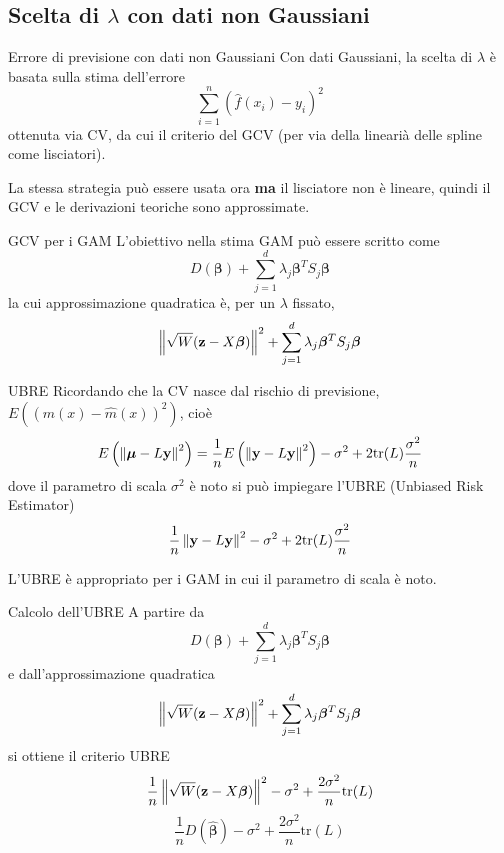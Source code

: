 \documentclass{beamer}\usepackage[]{graphicx}\usepackage[]{color}
\newcommand{\spazio}{\noindent\makebox[\linewidth]{\resizebox{0.1\linewidth}{1pt}{{$\bullet$}}}}
\begin{document}
\subsection{Scelta di $\lambda$ con dati non Gaussiani}

\begin{frame}{Errore di previsione  con dati non Gaussiani}
Con dati Gaussiani, la scelta di $\lambda$ \`e basata sulla stima dell'errore
\[ \sum_{i=1}^n (\hat{f}(x_i)-y_i)^2 \]
ottenuta via CV, da cui il criterio del GCV (per via della lineari\`a delle spline come lisciatori).

\spazio

La stessa strategia pu\`o essere usata ora {\bf ma} il lisciatore non \`e lineare, quindi il GCV e le derivazioni teoriche sono approssimate.

\end{frame}


\begin{frame}[t]{GCV per i GAM}
L'obiettivo nella stima GAM pu\`o essere scritto
come
\[ D({\bm\beta})+\sum_{j=1}^d\lambda_j{\bm\beta}^TS_j{\bm\beta} \]
la cui approssimazione quadratica \`e, per un $\lambda$ fissato,
\[
\left\Vert\sqrt{W} ({\bf z}-X{\bm\beta})\right\Vert^2 + \sum_{j=1}^d\lambda_j{\bm\beta}^TS_j{\bm\beta}
\]
\end{frame}


\begin{frame}{UBRE}
Ricordando che la CV nasce dal rischio di previsione, $E((m(x)-\hat{m}(x))^2)$, cio\`e
\[ E\left(\left\Vert{\bm\mu}-L{\bf y}\right\Vert^2\right)
=\frac{1}{n}E\left(\left\Vert{\bf y}-L{\bf y}\right\Vert^2\right) - \sigma^2 + 2\mbox{tr}(L)\frac{\sigma^2}{n}
\]
dove il parametro di scala $\sigma^2$ \`e noto si pu\`o impiegare l'UBRE (Unbiased Risk Estimator)
\[ \frac{1}{n}\left\Vert{\bf y}-L{\bf y}\right\Vert^2 - \sigma^2 + 2\mbox{tr}(L)\frac{\sigma^2}{n}
\]

\spazio

L'UBRE \`e appropriato per i GAM in cui il parametro di scala \`e noto.
\end{frame}

\begin{frame}{Calcolo dell'UBRE}
A partire da
\[ D({\bm\beta})+\sum_{j=1}^d\lambda_j{\bm\beta}^TS_j{\bm\beta} \]
e dall'approssimazione quadratica
\[
\left\Vert\sqrt{W} ({\bf z}-X{\bm\beta})\right\Vert^2 + \sum_{j=1}^d\lambda_j{\bm\beta}^TS_j{\bm\beta}
\]
si ottiene il criterio UBRE
\[
\frac{1}{n}\left\Vert\sqrt{W} ({\bf z}-X{\bm\beta})\right\Vert^2 -\sigma^2 + \frac{2\sigma^2}{n}\mbox{tr}(L)
\]
\[
\frac{1}{n}D({\bm\hat\beta}) -\sigma^2 + \frac{2\sigma^2}{n}\mbox{tr}(L)
\]
\end{frame}
\end{document}
